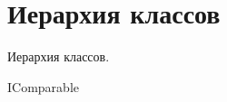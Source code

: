 \section{Иерархия классов}
Иерархия классов.\begin{DoxyCompactList}
\item I\+Comparable\begin{DoxyCompactList}
\item {}
\end{DoxyCompactList}
\item {}
\end{DoxyCompactList}
